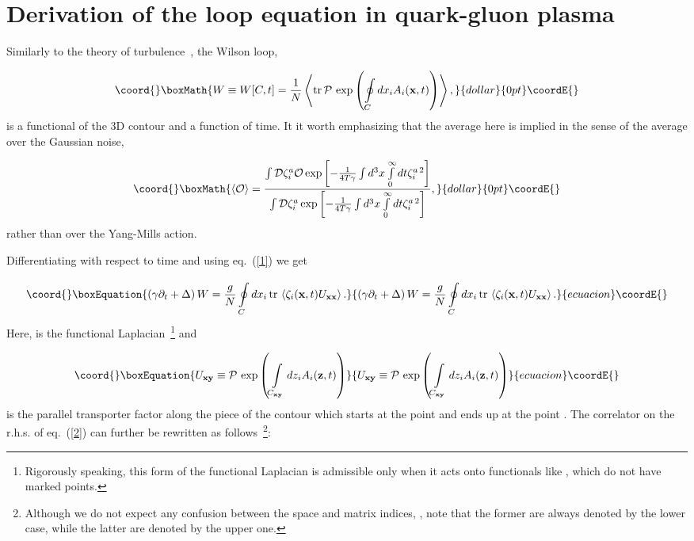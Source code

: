 \documentclass[a4paper,12pt]{article}
\begin{document}
\section{Derivation of the loop equation in quark-gluon plasma}

Similarly to the theory of turbulence~\cite{tur1}, the Wilson loop,

$$\coord{}\boxMath{W\equiv W[C,t]=\frac{1}{N}\left<{\rm tr}{\,}{\cal P}{\,}\exp
\left(\oint\limits_{C}^{} dx_i A_i({\bf x},t)\right)\right>,}{dollar}{0pt}\coordE{}$$
is a functional of the 3D contour \coordHE{} and a function of time. It it worth emphasizing that the average here is implied in the
sense of the average over the Gaussian noise,

$$\coord{}\boxMath{\left<{\cal O}\right>=\frac{\int {\cal D}\zeta_i^a{\cal O}\exp\left[-\frac{1}{4T\gamma}\int d^3x\int\limits_{0}^{\infty}dt
\zeta_i^{a{\,}2}\right]}{\int {\cal D}\zeta_i^a\exp\left[-\frac{1}{4T\gamma}\int d^3x\int\limits_{0}^{\infty}dt
\zeta_i^{a{\,}2}\right]},}{dollar}{0pt}\coordE{}$$
rather than over the Yang-Mills action.

Differentiating \coordHE{} with respect to time
and using eq.~(\ref{1}) we get

\begin{equation}\coord{}\boxEquation{
\label{2}
\left(\gamma\partial_t+\Delta\right)W=\frac{g}{N}
\oint\limits_{C}^{} dx_i{\,}{\rm tr}{\,}\left<\zeta_i({\bf x},t)U_{\bf xx}\right>.
}{
\left(\gamma\partial_t+\Delta\right)W=\frac{g}{N}
\oint\limits_{C}^{} dx_i{\,}{\rm tr}{\,}\left<\zeta_i({\bf x},t)U_{\bf xx}\right>.
}{ecuacion}\coordE{}\end{equation}
Here, \coordHE{} is the functional Laplacian~\footnote{Rigorously speaking, this form of the functional Laplacian is
admissible only when it acts onto functionals like \coordHE{}, which do not have marked points.} and

\begin{equation}\coord{}\boxEquation{
\label{u}
U_{\bf xy}\equiv{\cal P}{\,}\exp
\left(\int\limits_{C_{\bf xy}}^{} dz_i A_i({\bf z},t)\right)
}{
U_{\bf xy}\equiv{\cal P}{\,}\exp
\left(\int\limits_{C_{\bf xy}}^{} dz_i A_i({\bf z},t)\right)
}{ecuacion}\coordE{}\end{equation}
is the parallel transporter factor along the
piece \coordHE{} of the contour \coordHE{} which starts at the point \coordHE{} and ends up at the point \coordHE{}.
The correlator \coordHE{} on the r.h.s. of eq.~(\ref{2})
can further be rewritten as follows~\footnote{Although we do not expect any confusion between the space and matrix indices, \coordHE{},
note that the former are always denoted by the lower case, while the latter are denoted by the upper one.}:
\end{document}

